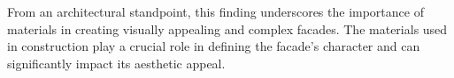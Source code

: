 
From an architectural standpoint, this finding underscores the importance of materials in creating visually appealing and complex facades.
 The materials used in construction play a crucial role in defining the facade's character and can significantly impact its aesthetic appeal.


%
%
%
%
%
%
%
%
%
